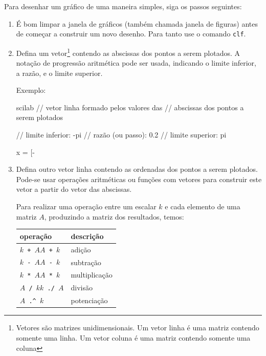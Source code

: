 \documentclass[11pt]{practice}
\begin{document}
Para desenhar um gráfico de uma maneira simples, siga os passos seguintes:
\begin{enumerate}
  \item É bom limpar a janela de gráficos (também chamada janela de
  figuras) antes de começar a construir um novo desenho. Para tanto use
  o comando \texttt{clf}.

  \item Defina um vetor\footnote{Vetores são matrizes
    unidimensionais. Um vetor linha é uma matriz contendo somente uma
    linha. Um vetor coluna é uma matriz contendo somente uma coluna}
  contendo as abscissas dos pontos a serem plotados. A notação de
  progressão aritmética pode ser usada, indicando o limite inferior, a
  razão, e o limite superior.

  Exemplo:
  \begin{lst}{scilab}
// vetor linha formado pelos valores das
// abscissas dos pontos a serem plotados

// limite inferior: -pi
// razão (ou passo): 0.2
// limite superior: pi

x = [-%
  \end{lst}

  \item Defina outro vetor linha contendo as ordenadas dos pontos a
  serem plotados. Pode-se usar operações aritméticas ou funções com
  vetores para construir este vetor a partir do vetor das abscissas.

  Para realizar uma operação entre um escalar $k$ e cada elemento de uma
  matriz $A$, produzindo a matriz dos resultados, temos:
  \begin{center}
    \begin{tabular}{p{2cm}l} \hline
      \textbf{operação} & \textbf{descrição} \\\hline
      \texttt{$k$ + $A$}\newline \texttt{$A$ + $k$}  & adição \\\hline
      \texttt{$k$ - $A$}\newline \texttt{$A$ - $k$}  & subtração \\\hline
      \texttt{$k$ * $A$}\newline \texttt{$A$ * $k$}  & multiplicação \\\hline
      \texttt{$A$ / $k$}\newline \texttt{$k$ ./ $A$}  & divisão \\\hline
      \texttt{$A$ .\textasciicircum\ $k$}  & potenciação \\\hline
    \end{tabular}
  \end{center}


\end{enumerate}
\end{document}
